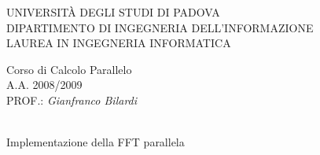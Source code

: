 \begin{titlepage}

		\thispagestyle{empty}
    \begin{figure}
    \centering
      \quad     {}
    \end{figure}
    
    \vskip 1.5cm{
    \begin{center}\sc
        UNIVERSIT\`A DEGLI STUDI DI PADOVA\\
        DIPARTIMENTO DI INGEGNERIA DELL'INFORMAZIONE\\
        LAUREA IN INGEGNERIA INFORMATICA\end{center}
		}
		
		\vskip1.2cm\begin{center}
    	\rm\large\expandafter{Corso di Calcolo Parallelo\\}
      \rm\large\uppercase\expandafter{A.A. 2008/2009\\}
      \rm\large\uppercase\expandafter{Prof.:}
    	\emph{Gianfranco Bilardi}\end{center}
    	
    \vskip1.6cm\begin{center}
    \HRule \\[0.4cm]\LARGE\expandafter{Implementazione della FFT parallela}
    \HRule \\[0.4cm]
    \end{center}
    

\end{titlepage}
